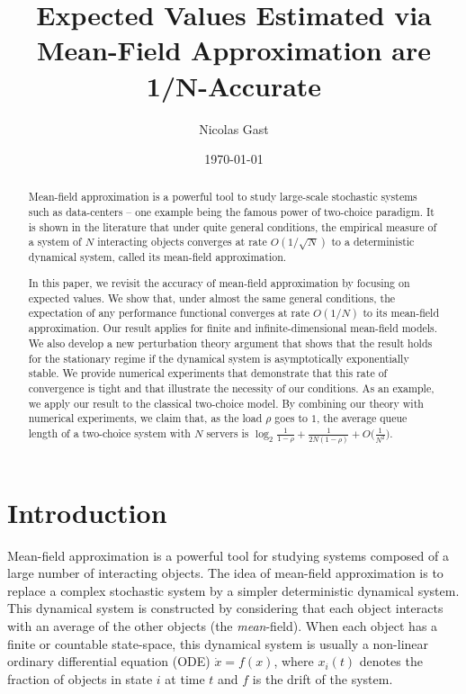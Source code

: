 \documentclass[sigconf]{acmart}
\title{Expected Values Estimated via Mean-Field Approximation are
  1/N-Accurate}
\author{Nicolas Gast}
\date{\today}
\begin{document}
\begin{abstract}
  Mean-field approximation is a powerful tool to study large-scale
  stochastic systems such as data-centers -- one example being the
  famous power of two-choice paradigm.  It is shown in the literature
  that under quite general conditions, the empirical measure of a
  system of $N$ interacting objects converges at rate $O(1/\sqrt{N})$
  to a deterministic dynamical system, called its mean-field
  approximation.

  In this paper, we revisit the accuracy of mean-field approximation
  by focusing on expected values.  We show that, under almost the same
  general conditions, the expectation of any performance functional
  converges at rate $O(1/N)$ to its mean-field approximation.  Our
  result applies for finite and infinite-dimensional mean-field
  models. We also develop a new perturbation theory argument that
  shows that the result holds for the stationary regime if the
  dynamical system is asymptotically exponentially stable.  We provide
  numerical experiments that demonstrate that this rate of convergence
  is tight and that illustrate the necessity of our conditions.  As an
  example, we apply our result to the classical two-choice model. By
  combining our theory with numerical experiments, we claim that, as
  the load $\rho$ goes to $1$, the average queue length of a
  two-choice system with $N$ servers is
  $\log_2\frac1{1-\rho} + \frac1{2N(1-\rho)}
  +O\big(\frac1{N^2}\big)$.
\end{abstract}

\maketitle

\section{Introduction}

Mean-field approximation is a powerful tool for studying systems
composed of a large number of interacting objects. The idea of
mean-field approximation is to replace a complex stochastic system by
a simpler deterministic dynamical system.  This dynamical system is
constructed by considering that each object interacts with an average
of the other objects (the \emph{mean}-field). When each object has a
finite or countable state-space, this dynamical system is usually a
non-linear ordinary differential equation (ODE) $\dot{x}=f(x)$, where
$x_i(t)$ denotes the fraction of objects in state $i$ at time $t$ and
$f$ is the drift of the system.
\end{document}
